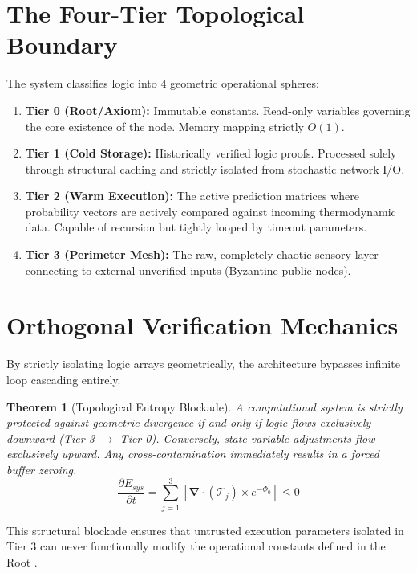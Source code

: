 \documentclass[12pt, a4paper]{article}
\theoremstyle{plain}
\newtheorem{theorem}{Theorem}[section]
\theoremstyle{definition}
\begin{document}
\section{The Four-Tier Topological Boundary}
The system classifies logic into 4 geometric operational spheres:
\begin{enumerate}
    \item \textbf{Tier 0 (Root/Axiom):} Immutable constants. Read-only variables governing the core existence of the node. Memory mapping strictly $O(1)$.
    \item \textbf{Tier 1 (Cold Storage):} Historically verified logic proofs. Processed solely through structural caching and strictly isolated from stochastic network I/O.
    \item \textbf{Tier 2 (Warm Execution):} The active prediction matrices where probability vectors are actively compared against incoming thermodynamic data. Capable of recursion but tightly looped by timeout parameters.
    \item \textbf{Tier 3 (Perimeter Mesh):} The raw, completely chaotic sensory layer connecting to external unverified inputs (Byzantine public nodes).
\end{enumerate}

\section{Orthogonal Verification Mechanics}
By strictly isolating logic arrays geometrically, the architecture bypasses infinite loop cascading entirely.

\begin{theorem}[Topological Entropy Blockade]
A computational system is strictly protected against geometric divergence if and only if logic flows exclusively downward (Tier 3 $\to$ Tier 0). Conversely, state-variable adjustments flow exclusively upward. Any cross-contamination immediately results in a forced buffer zeroing.
\begin{equation}
    \frac{\partial E_{sys}}{\partial t} = \sum_{j=1}^{3} \left[ \mathbf{\nabla} \cdot (\mathcal{T}_j) \times e^{-\Phi_0} \right] \leq 0
\end{equation}
\end{theorem}
This structural blockade ensures that untrusted execution parameters isolated in Tier 3 can never functionally modify the operational constants defined in the Root \cite{turing1936computable}.
\end{document}
